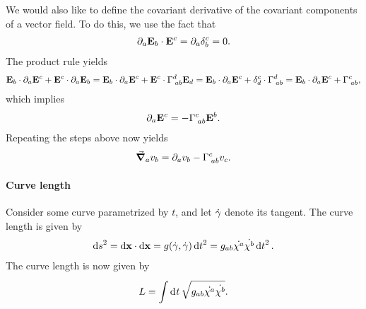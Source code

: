 We would also like to define the covariant derivative of the covariant components of a vector field. To do this, we use the fact that
\begin{align*}
	\partial_{a}\vb{E}_{b}\cdot\vb{E}^{c} = \partial_{a}\delta_{b}^{c} = 0.
\end{align*}
The product rule yields
\begin{align*}
	\vb{E}_{b}\cdot\partial_{a}\vb{E}^{c} + \vb{E}^{c}\cdot\partial_{a}\vb{E}_{b} = \vb{E}_{b}\cdot\partial_{a}\vb{E}^{c} + \vb{E}^{c}\cdot\Gamma^{d}_{\;ab}\vb{E}_{d} = \vb{E}_{b}\cdot\partial_{a}\vb{E}^{c} + \delta_{d}^{c}\cdot\Gamma^{d}_{\;ab} = \vb{E}_{b}\cdot\partial_{a}\vb{E}^{c} + \Gamma^{c}_{\;ab},
\end{align*}
which implies
\begin{align*}
	\partial_{a}\vb{E}^{c} = -\Gamma^{c}_{\;ab}\vb{E}^{b}.
\end{align*}
Repeating the steps above now yields
\begin{align*}
	\grad_{a}{v_{b}} = \partial_{a}v_{b} - \Gamma^{c}_{\;ab}v_{c}.
\end{align*}

\paragraph{Curve length}
Consider some curve parametrized by $t$, and let $\dot{\vb{\gamma}}$ denote its tangent. The curve length is given by
\begin{align*}
	\dd{s}^{2} = \dd{\vb{x}}\cdot\dd{\vb{x}} = g(\dot{\vb{\gamma}}, \dot{\vb{\gamma}})\dd{t}^{2} = g_{ab}\dot{\chi^{a}}\dot{\chi^{b}}\dd{t}^{2}.
\end{align*}
The curve length is now given by
\begin{align*}
	L = \int\limits_{}^{}\dd[]{t}\sqrt{g_{ab}\dot{\chi^{a}}\dot{\chi^{b}}}.
\end{align*}

